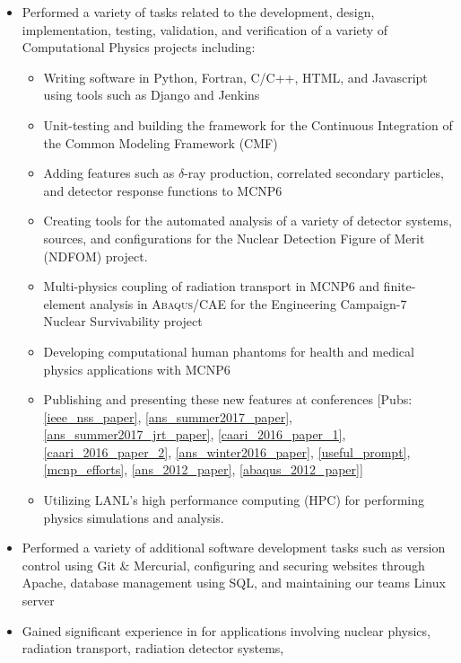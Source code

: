 \begin{minipage}{\textwidth}
	\begin{center}
		\begin{itemize}
			\item Performed a variety of tasks related to the development, design, implementation, testing, validation, and verification of a variety of Computational Physics projects including: \vspace{2mm}
			\begin{itemize}
				\item Writing software in Python, Fortran, C/C++, HTML, and Javascript using tools such as Django and Jenkins
				\item Unit-testing and building the framework for the Continuous Integration of the Common Modeling Framework (CMF)
				\item Adding features such as $\delta$-ray production, correlated secondary particles, and detector response functions to \textsc{MCNP6} 
				\item Creating tools for the automated analysis of a variety of detector systems, sources, and configurations for the Nuclear Detection Figure of Merit (NDFOM) project.
	    			\item Multi-physics coupling of radiation transport in \textsc{MCNP6} and finite-element analysis in \textsc{Abaqus/CAE} for the Engineering Campaign-7 Nuclear Survivability project %
	    			\item Developing computational human phantoms for health and medical physics applications with \textsc{MCNP6} 
				\item Publishing and presenting these new features at conferences [Pubs: \ref{ieee_nss_paper}, \ref{ans_summer2017_paper}, \ref{ans_summer2017_jrt_paper}, \ref{caari_2016_paper_1}, \ref{caari_2016_paper_2}, \ref{ans_winter2016_paper}, \ref{useful_prompt},\ref{mcnp_efforts}, \ref{ans_2012_paper}, \ref{abaqus_2012_paper}]
				\item Utilizing LANL's high performance computing (HPC) for performing physics simulations and analysis.
			\end{itemize}

			\item Performed a variety of additional software development tasks such as version control using Git \& Mercurial, configuring and securing websites through Apache, database management using SQL, and maintaining our teams Linux server
			\item Gained significant experience in for applications involving nuclear physics, radiation transport, radiation detector systems, 



\end{itemize}
\end{center}
\end{minipage}
